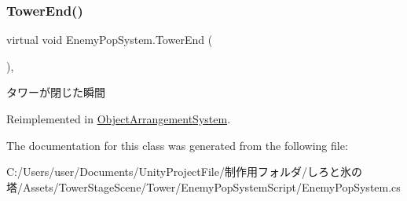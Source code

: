 \subsubsection{\texorpdfstring{Tower\+End()}{TowerEnd()}}
{\footnotesize\ttfamily virtual void Enemy\+Pop\+System.\+Tower\+End (\begin{DoxyParamCaption}{ }\end{DoxyParamCaption})\hspace{0.3cm}{\ttfamily [inline]}, {\ttfamily [virtual]}}



タワーが閉じた瞬間 



Reimplemented in \hyperlink{class_object_arrangement_system_a3f1c0ac72189d1a065596b408b04348e}{Object\+Arrangement\+System}.



The documentation for this class was generated from the following file\+:\begin{DoxyCompactItemize}
\item 
C\+:/\+Users/user/\+Documents/\+Unity\+Project\+File/制作用フォルダ/しろと氷の塔/\+Assets/\+Tower\+Stage\+Scene/\+Tower/\+Enemy\+Pop\+System\+Script/Enemy\+Pop\+System.\+cs\end{DoxyCompactItemize}
